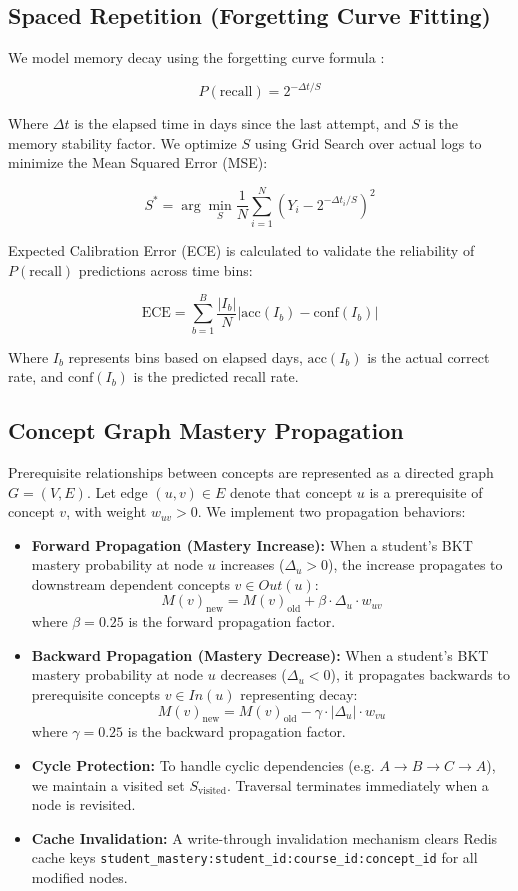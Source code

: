 \documentclass{article}
\begin{document}
\subsection{Spaced Repetition (Forgetting Curve Fitting)}
We model memory decay using the forgetting curve formula \cite{wozniak1994optimization, settles2016trainable}:

\[P(\text{recall}) = 2^{-\Delta t / S}\]

Where $\Delta t$ is the elapsed time in days since the last attempt, and $S$ is the memory stability factor. We optimize $S$ using Grid Search over actual logs to minimize the Mean Squared Error (MSE):

\[S^* = \arg\min_{S} \frac{1}{N} \sum_{i=1}^N \left( Y_i - 2^{-\Delta t_i / S} \right)^2\]

Expected Calibration Error (ECE) is calculated to validate the reliability of $P(\text{recall})$ predictions across time bins:

\[\text{ECE} = \sum_{b=1}^B \frac{|I_b|}{N} \left| \text{acc}(I_b) - \text{conf}(I_b) \right|\]

Where $I_b$ represents bins based on elapsed days, $\text{acc}(I_b)$ is the actual correct rate, and $\text{conf}(I_b)$ is the predicted recall rate.

\subsection{Concept Graph Mastery Propagation}
Prerequisite relationships between concepts are represented as a directed graph $G = (V, E)$. Let edge $(u, v) \in E$ denote that concept $u$ is a prerequisite of concept $v$, with weight $w_{uv} > 0$. We implement two propagation behaviors:

\begin{itemize}
    \item \textbf{Forward Propagation (Mastery Increase):} When a student's BKT mastery probability at node $u$ increases ($\Delta_u > 0$), the increase propagates to downstream dependent concepts $v \in Out(u)$:
  \[M(v)_{\text{new}} = M(v)_{\text{old}} + \beta \cdot \Delta_u \cdot w_{uv}\]
  where $\beta = 0.25$ is the forward propagation factor.
    \item \textbf{Backward Propagation (Mastery Decrease):} When a student's BKT mastery probability at node $u$ decreases ($\Delta_u < 0$), it propagates backwards to prerequisite concepts $v \in In(u)$ representing decay:
  \[M(v)_{\text{new}} = M(v)_{\text{old}} - \gamma \cdot |\Delta_u| \cdot w_{vu}\]
  where $\gamma = 0.25$ is the backward propagation factor.
    \item \textbf{Cycle Protection:} To handle cyclic dependencies (e.g. $A \rightarrow B \rightarrow C \rightarrow A$), we maintain a visited set $S_{\text{visited}}$. Traversal terminates immediately when a node is revisited.
    \item \textbf{Cache Invalidation:} A write-through invalidation mechanism clears Redis cache keys \texttt{student\_mastery:student\_id:course\_id:concept\_id} for all modified nodes.
\end{itemize}
\end{document}
